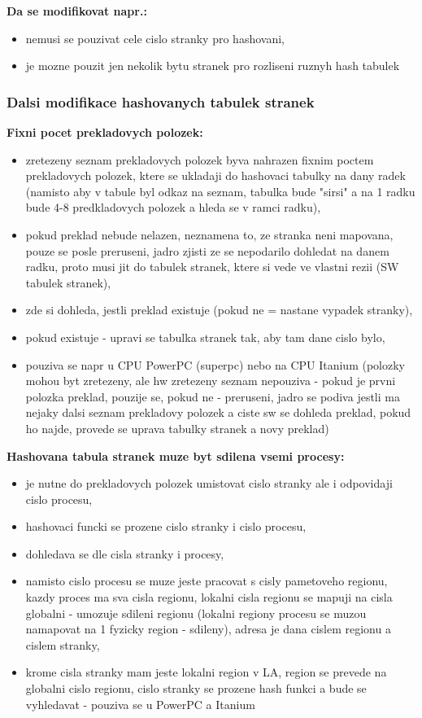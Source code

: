 \documentclass[a4paper, 11pt]{article}
\begin{document}
\textbf{Da se modifikovat napr.:}
\begin{itemize}
    \item nemusi se pouzivat cele cislo stranky pro hashovani,
    \item je mozne pouzit jen nekolik bytu stranek pro rozliseni ruznyh hash tabulek \\
\end{itemize}

\subsubsection{Dalsi modifikace hashovanych tabulek stranek}
\textbf{Fixni pocet prekladovych polozek:}
\begin{itemize}
    \item zretezeny seznam prekladovych polozek byva nahrazen fixnim poctem prekladovych polozek, ktere se ukladaji do hashovaci tabulky na dany radek (namisto aby v tabule byl odkaz na seznam, tabulka bude "sirsi" a na 1 radku bude 4-8 predkladovych polozek a hleda se v ramci radku),
    \item pokud preklad nebude nelazen, neznamena to, ze stranka neni mapovana, pouze se posle preruseni, jadro zjisti ze se nepodarilo dohledat na danem radku, proto musi jit do tabulek stranek, ktere si vede ve vlastni rezii (SW tabulek stranek),
    \item zde si dohleda, jestli preklad existuje (pokud ne = nastane vypadek stranky),
    \item pokud existuje - upravi se tabulka stranek tak, aby tam dane cislo bylo,
    \item pouziva se napr u CPU PowerPC (superpc) nebo na CPU Itanium (polozky mohou byt zretezeny, ale hw zretezeny seznam nepouziva - pokud je prvni polozka preklad, pouzije se, pokud ne - preruseni, jadro se podiva jestli ma nejaky dalsi seznam prekladovy polozek a ciste sw se dohleda preklad, pokud ho najde, provede se uprava tabulky stranek a novy preklad) \\
\end{itemize}

\textbf{Hashovana tabula stranek muze byt sdilena vsemi procesy:}
\begin{itemize}
    \item je nutne do prekladovych polozek umistovat cislo stranky ale i odpovidaji cislo procesu,
    \item hashovaci funcki se prozene cislo stranky i cislo procesu,
    \item dohledava se dle cisla stranky i procesy,
    \item namisto cislo procesu se muze jeste pracovat s cisly pametoveho regionu, kazdy proces ma sva cisla regionu, lokalni cisla regionu se mapuji na cisla globalni - umozuje sdileni regionu (lokalni regiony procesu se muzou namapovat na 1 fyzicky region - sdileny), adresa je dana cislem regionu a cislem stranky,
    \item krome cisla stranky mam jeste lokalni region v LA, region se prevede na globalni cislo regionu, cislo stranky se prozene hash funkci a bude se vyhledavat - pouziva se u PowerPC a Itanium \\
\end{itemize}
\end{document}
